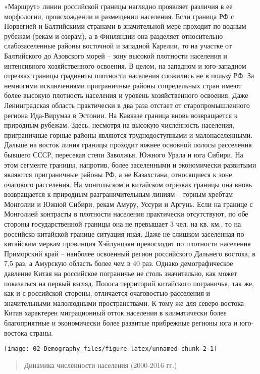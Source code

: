 \documentclass[]{book}
\begin{document}
«Маршрут» линии российской границы наглядно проявляет различия в ее
морфологии, происхождении и размещении населения. Если граница РФ с
Норвегией и Балтийскими странами в значительной мере проходит по водным
рубежам (рекам и озерам), а в Финляндии она разделяет относительно
слабозаселенные районы восточной и западной Карелии, то на участке от
Балтийского до Азовского морей -- зону высокой плотности населения и
интенсивного хозяйственного освоения. В целом, на западном и
юго-западном отрезках границы градиенты плотности населения сложились не
в пользу РФ. За немногими исключениями приграничные районы сопредельных
стран имеют более высокую плотность населения и уровень хозяйственного
освоения. Даже Ленинградская область практически в два раза отстает от
старопромышленного региона Ида-Вирумаа в Эстонии. На Кавказе граница
вновь возвращается к природным рубежам. Здесь, несмотря на высокую
численность населения, приграничные горные районы являются
труднодоступными и малонаселенными. Дальше на восток линия границы
проходит южнее основной полосы расселения бывшего СССР, пересекая степи
Заволжья, Южного Урала и юга Сибири. На этом сегменте границы, напротив,
более заселенными и экономически развитыми являются приграничные районы
РФ, а не Казахстана, относящиеся к зоне очагового расселения. На
монгольском и китайском отрезках границы она вновь возвращается к
природным разграничительным линиям -- горным хребтам Монголии и Южной
Сибири, рекам Амуру, Уссури и Аргунь. Если на границе с Монголией
контрасты в плотности населения практически отсутствуют, по обе стороны
государственной границы она не превышает 3 чел. на кв. км., то на
российско-китайской границе ситуация иная. Даже не слишком заселенная по
китайским меркам провинция Хэйлунцзян превосходит по плотности населения
Приморский край -- наиболее освоенный регион российского Дальнего
востока, в 7,5 раз, а Амурскую область более чем в 40 раз. Однако
демографическое давление Китая на российское пограничье не столь
значительно, как может показаться на первый взгляд. Полоса территорий
китайского пограничья, так же, как и с российской стороны, отличается
очаговостью расселения и значительными малолюдными пространствами. К
тому же для северо-востока Китая характерен миграционный отток населения
в климатически более благоприятные и экономически более развитые
прибрежные регионы юга и юго-востока страны.

\texttt{[image: 02-Demography\_files/figure-latex/unnamed-chunk-2-1]}

\begin{quote}
Динамика численности населения (2000-2016 гг.)
\end{quote}
\end{document}
